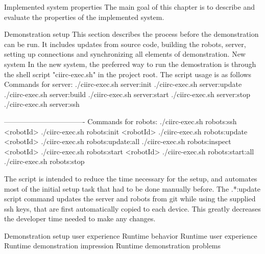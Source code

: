 \chap Implemented system properties
The main goal of this chapter is to describe and evaluate the properties of the implemented system.

\sec Demonstration setup
This section describes the process before the demonstration can be run. It includes updates from source code, building the robots, server, setting up connections and synchronizing all elements of demonstration.
\secc New system
In the new system, the preferred way to run the demostration is through the shell script "ciirc-exec.sh" in the project root. The script usage is as follows
\begtt
Commands for server:
./ciirc-exec.sh server:init
./ciirc-exec.sh server:update
./ciirc-exec.sh server:build
./ciirc-exec.sh server:start
./ciirc-exec.sh server:stop
./ciirc-exec.sh server:ssh

----------------------------------
Commands for robots:
./ciirc-exec.sh robots:ssh <robotId>
./ciirc-exec.sh robots:init <robotId>
./ciirc-exec.sh robots:update <robotId>
./ciirc-exec.sh robots:update:all
./ciirc-exec.sh robots:inspect <robotId>
./ciirc-exec.sh robots:start <robotId>
./ciirc-exec.sh robots:start:all
./ciirc-exec.sh robots:stop
\endtt

The script is intended to reduce the time necessary for the setup, and automates most of the initial setup task that had to be done manually before. The .*:update script command updates the server and robots from git while using the supplied ssh keys, that are first automatically copied to each device. This greatly decreases the developer time needed to make any changes.

\sec Demonstration setup user experience
\sec Runtime behavior
\sec Runtime user experience
\sec Runtime demonstration impression
\sec Runtime demonstration problems